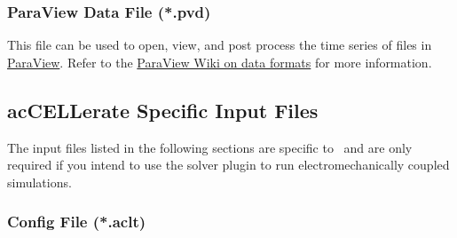 \subsubsection{ParaView Data File (*.pvd)}

This file can be used to open, view, and post process the time series of  files in \href{https://www.paraview.org/}{ParaView}. 
Refer to the \href{https://www.paraview.org/Wiki/ParaView/Data_formats#PVD_File_Format}{ParaView Wiki on data formats} for more information.

\subsection{acCELLerate Specific Input Files}
\label{files:acCELLerate}

The input files listed in the following sections are specific to \ACC~and are only required if you intend to use the solver plugin  to run electromechanically coupled simulations.

\subsubsection{Config File (*.aclt)}
\label{files:ACCConfig}

